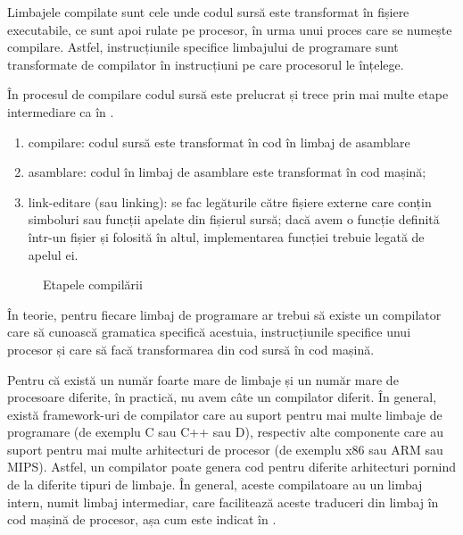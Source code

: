 Limbajele compilate sunt cele unde codul sursă este transformat în fișiere
executabile, ce sunt apoi rulate pe procesor, în urma unui proces care se
numește compilare. Astfel, instrucțiunile specifice limbajului de programare
sunt transformate de compilator în instrucțiuni pe care procesorul le înțelege.

În procesul de compilare codul sursă este prelucrat și trece prin mai multe
etape intermediare ca în .

\begin{enumerate}
  \item compilare: codul sursă este transformat în cod în limbaj de
          asamblare
  \item asamblare: codul în limbaj de asamblare este transformat în cod
          mașină;
  \item link-editare (sau linking): se fac legăturile către fișiere externe care conțin
          simboluri sau funcții apelate din fișierul sursă; dacă avem o
          funcție definită într-un fișier și folosită în altul,
          implementarea funcției trebuie legată de apelul ei.
\end{enumerate}

\begin{figure}[htbp]
  \centering
  \def\svgwidth{0.6\columnwidth}
  
  \caption{Etapele compilării}
  \label{fig:appdev:compile-phases}
\end{figure}

În teorie, pentru fiecare limbaj de programare ar trebui să existe un compilator
care să cunoască gramatica specifică acestuia, instrucțiunile
specifice unui procesor și care să facă transformarea din cod sursă în cod
mașină.

Pentru că există un număr foarte mare de limbaje și un număr mare de procesoare
diferite, în practică, nu avem câte un compilator diferit. În general, există
framework-uri de compilator care au suport pentru mai multe limbaje de programare (de exemplu C sau C++ sau D), respectiv alte
componente care au suport pentru mai multe arhitecturi de procesor (de exemplu x86 sau ARM sau MIPS). Astfel, un compilator poate genera cod pentru diferite arhitecturi pornind de la diferite tipuri de limbaje. În general, aceste compilatoare au un limbaj intern, numit limbaj intermediar, care facilitează aceste traduceri din limbaj în cod mașină de procesor, așa cum este indicat în .

